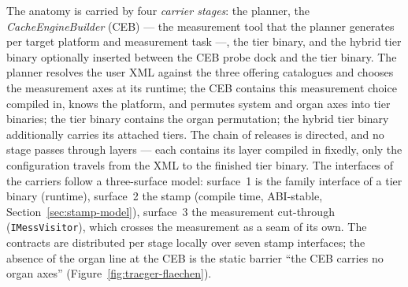 \begin{nurkurz}
The anatomy is carried by four \emph{carrier stages}: the planner, the \emph{CacheEngineBuilder} (CEB) ---
the measurement tool that the planner generates per target platform and measurement task ---, the tier
binary, and the hybrid tier binary optionally inserted between the CEB probe dock and the tier binary. The
planner resolves the user XML against the three offering catalogues and chooses the measurement axes at its
runtime; the CEB contains this measurement choice compiled in,
knows the platform, and permutes system and organ axes into tier binaries; the tier binary contains the
organ permutation; the hybrid tier binary additionally carries its attached tiers. The chain of releases is
directed, and no stage passes through layers --- each contains its layer compiled in fixedly, only the
configuration travels from the XML to the finished tier binary. The interfaces of the carriers follow a
three-surface model: surface~1 is the family interface of a tier binary (runtime), surface~2 the stamp
(compile time, ABI-stable, Section~\ref{sec:stamp-model}), surface~3 the measurement cut-through
(\texttt{IMessVisitor}), which crosses the measurement as a seam of its own. The contracts are distributed
per stage locally over seven stamp interfaces; the absence of the organ line at the CEB is the static
barrier \enquote{the CEB carries no organ axes} (Figure~\ref{fig:traeger-flaechen}).
\begin{figure}[htbp]\centering
{}
\end{figure}
\end{nurkurz}
